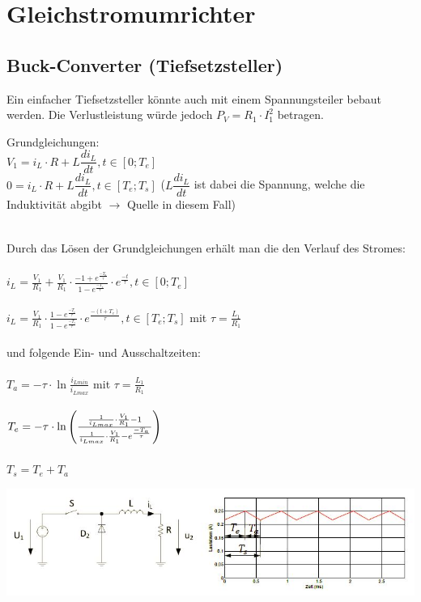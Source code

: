 \section{Gleichstromumrichter}
\subsection{Buck-Converter (Tiefsetzsteller)}
Ein einfacher Tiefsetzsteller könnte auch mit einem Spannungsteiler bebaut werden.
Die Verlustleistung würde jedoch $P_{V} = R_{1} \cdot I_{1}^2$ betragen.


Grundgleichungen:\\
$V_{1}= i_{L} \cdot R + L\dfrac{di_{L}}{dt}, t \in [0; T_{e}]$\\
$0 = i_{L} \cdot R + L\dfrac{di_{L}}{dt}, t \in [T_{e}; T_{s}]$ ($L\dfrac{di_{L}}{dt}$ ist dabei die Spannung, welche die Induktivität abgibt
$\rightarrow$ Quelle in diesem Fall)\\\\

\begin{minipage}{ 0.5 \linewidth}
  Durch das Lösen der Grundgleichungen erhält man die den Verlauf des Stromes:\\\\
  
  $i_{L} = \frac{V_{1}}{R_{1}}+\frac{V_{1}}{R_{1}} \cdot \frac{-1+e^{\frac{-T_{a}}{\tau}}}{1-e^{\frac{-T_{s}}{\tau}}} \cdot e^{\frac{-t}{\tau}}, t \in [0; T_{e}]$\\\\
  $i_{L} = \frac{V_{1}}{R_{1}} \cdot \frac{1-e^{\frac{-T_{e}}{\tau}}}{1-e^{\frac{-T_{s}}{\tau}}} \cdot e^{\frac{-(t+T_{e})}{\tau}}, t \in [T_{e}; T_{s}]$ mit $\tau = \frac{L_{1}}{R_{1}}$\\\\
  und folgende Ein- und Ausschaltzeiten:\\\\
  $T_{a} = -\tau \cdot \ln\frac{i_{Lmin}}{i_{Lmax}}$ mit $\tau = \frac{L_{1}}{R_{1}}$\\\\
  $T_{e} = -\tau \cdot \ln\left(\frac{\frac{1}{i_{Lmax}} \cdot \frac{V_{1}}{R_{1}} - 1}{\frac{1}{i_{Lmax}} \cdot \frac{V_{1}}{R_{1}}-e^{\frac{-T_{a}}{\tau}}}\right)$\\\\
  $T_{s} = T_{e} + T_{a}$
\end{minipage}
\hfill
\begin{minipage}{0.5 \linewidth}
  \includegraphics[width = \textwidth]{./pictures/buckConverter}
\end{minipage}
